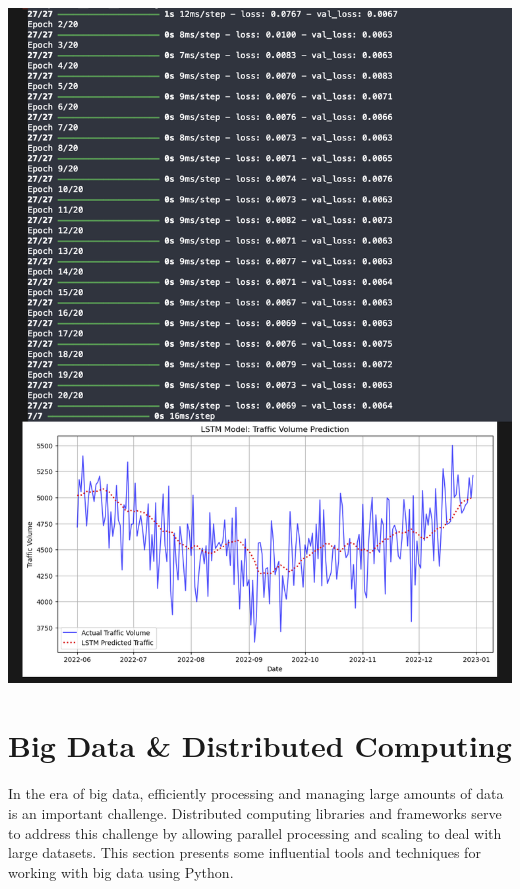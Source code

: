 \documentclass{article}
\begin{document}
\begin{itemize}
\begin{itemize}
\includegraphics[width=14cm,height=18
cm]{LSTM_Output.png}

\end{itemize}
\end{itemize}

\newpage
\section{Big Data \& Distributed Computing}
In the era of big data, efficiently processing and managing large amounts of data is an important challenge. Distributed computing libraries and frameworks serve to address this challenge by allowing parallel processing and scaling to deal with large datasets. This section presents some influential tools and techniques for working with big data using Python.
\end{document}
